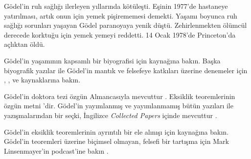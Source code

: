 G{\"o}del'in ruh sağlığı ilerleyen yıllarında kötüleşti. Eşinin 1977'de
hastaneye yatırılması, artık onun için yemek pişirememesi demekti. Yaşamı
boyunca ruh sağlığı sorunları yaşayan G{\"o}del paranoyaya yenik düştü.
Zehirlenmekten ölümcül derecede korktuğu için yemek yemeyi reddetti. 14 Ocak
1978'de Princeton'da açlıktan öldü.

\begin{reading}
G{\"o}del'in yaşamının kapsamlı bir biyografisi için \citet{Dawson1997}
kaynağına bakın. Başka biyografik yazılar ile G{\"o}del'in mantık ve felsefeye
katkıları üzerine denemeler için \citet{Wang1990}, \citet{Baaz2011},
\citet{Takeuti2003} ve \citet{Sigmund2007} kaynaklarına bakın.

G{\"o}del'in doktora tezi özgün Almancasıyla mevcuttur \citep{Godel1929}.
Eksiklik teoremlerinin özgün metni \citep{Godel1931}'dir. G\"odel'in
yayımlanmış ve yayımlanmamış bütün yazıları ile yazışmalarından bir seçki,
İngilizce \emph{Collected Papers} içinde mevcuttur
\citet{Godel1986,Godel1990}.

G{\"o}del'in eksiklik teoremlerinin ayrıntılı bir ele alınışı için
\citet{Smith2013} kaynağına bakın. G{\"o}del'in teoremleri üzerine biçimsel
olmayan, felsefi bir tartışma için Mark Linsenmayer'in podcast'ine bakın
\citep{Linsenmayer2014}.
\end{reading}

